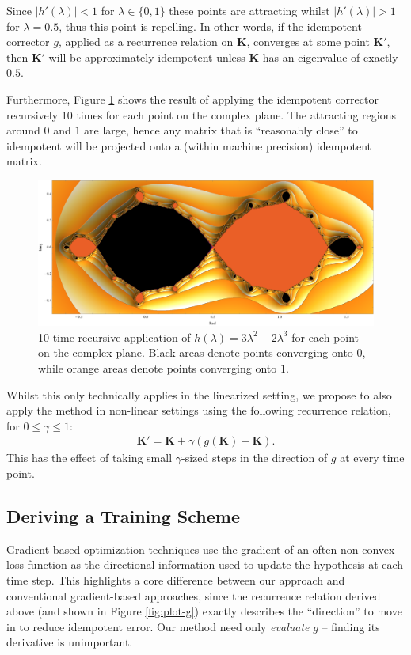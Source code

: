 \documentclass{article}
\theoremstyle{plain}
\theoremstyle{definition}
\theoremstyle{remark}
\newcommand{\vK}{\mathbf{K}}
\begin{document}
Since ${|h'(\lambda)| < 1}$ for ${\lambda \in \{0, 1\}}$ these points are attracting whilst ${|h'(\lambda)| > 1}$ for ${\lambda = 0.5}$, thus this point is repelling. In other words, if the idempotent corrector $g$, applied as a recurrence relation on $\vK$, converges at some point $\vK'$, then $\vK'$ will be approximately idempotent unless $\vK$ has an eigenvalue of exactly $0.5$.

Furthermore, Figure \ref{fig:fractal} shows the result of applying the idempotent corrector recursively 10 times for each point on the complex plane. The attracting regions around $0$ and $1$ are large, hence any matrix that is ``reasonably close'' to idempotent will be projected onto a (within machine precision) idempotent matrix.

\begin{figure}[!htp]
    \centering
    \includegraphics[width=\textwidth]{./resources/fractal.pdf}
    \caption{10-time recursive application of $h(\lambda) = 3\lambda^2 - 2\lambda^3$ for each point on the complex plane. Black areas denote points converging onto $0$, while orange areas denote points converging onto $1$.}
    \label{fig:fractal}
\end{figure}

Whilst this only technically applies in the linearized setting, we propose to also apply the method in non-linear settings using the following recurrence relation, for $0 \leq \gamma \leq 1$:
%
\begin{align}
    \vK' = \vK + \gamma(g(\vK) - \vK).
\end{align}
%
This has the effect of taking small $\gamma$-sized steps in the direction of $g$ at every time point.

\subsection{Deriving a Training Scheme}
\label{sec:method-scheme}
Gradient-based optimization techniques use the gradient of an often non-convex loss function as the directional information used to update the hypothesis at each time step. This highlights a core difference between our approach and conventional gradient-based approaches, since the recurrence relation derived above (and shown in Figure \ref{fig:plot-g}) exactly describes the ``direction'' to move in to reduce idempotent error. Our method need only \textit{evaluate} $g$ -- finding its derivative is unimportant.
\end{document}

